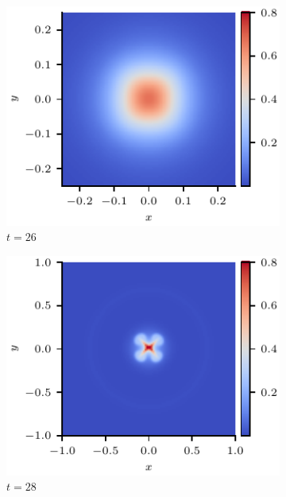 \documentclass[fleqn,usenatbib]{mnras}
\begin{document}
\begin{figure}
  \centering
    \begin{subfigure}{0.32\textwidth}
      \includegraphics[width=\linewidth]{swi-4_pressure_13.pdf}
      \caption{$t=26$}
      \label{fig:swi-4_pressure_13}
    \end{subfigure}
    \hfill
    \begin{subfigure}{0.32\textwidth}
      \includegraphics[width=\linewidth]{swi-4_pressure_14.pdf}
      \caption{$t=28$}
      \label{fig:swi-4_pressure_14}
    \end{subfigure}
    \hfill
    \begin{subfigure}{0.32\textwidth}

\end{subfigure}
\end{figure}
\end{document}
